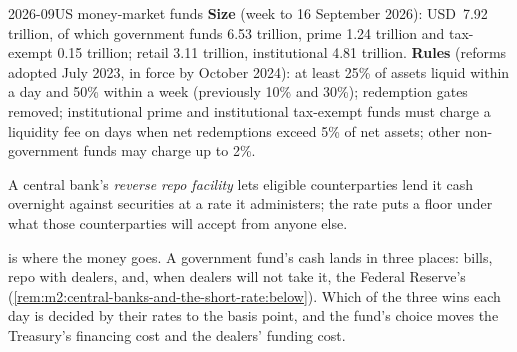 \begin{dated}{2026-09}{US money-market funds}\label{dat:m2:money-markets:mmf}
\textbf{Size} (week to 16 September 2026): USD~7.92 trillion, of which
government funds 6.53 trillion, prime 1.24 trillion and tax-exempt 0.15
trillion; retail 3.11 trillion, institutional 4.81 trillion.
\textbf{Rules} (reforms adopted July 2023, in force by October 2024): at least
25\% of assets liquid within a day and 50\% within a week (previously 10\% and
30\%); redemption gates removed; institutional prime and institutional
tax-exempt funds must charge a liquidity fee on days when net redemptions
exceed 5\% of net assets; other non-government funds may charge up to 2\%.
\end{dated}

\begin{definition}\label{def:m2:money-markets:rrp}
A central bank's \emph{reverse repo facility} lets
eligible counterparties lend it cash overnight against securities at a rate it
administers; the rate puts a floor under what those counterparties will accept
from anyone else.
\end{definition}

 is where the money goes. A government
fund's cash lands in three places: bills, repo with dealers, and, when
dealers will not take it, the Federal Reserve's 
(\cref{rem:m2:central-banks-and-the-short-rate:below}). Which of the three
wins each day is decided by their rates to the basis point, and the fund's
choice moves the Treasury's financing cost and the dealers' funding cost.


